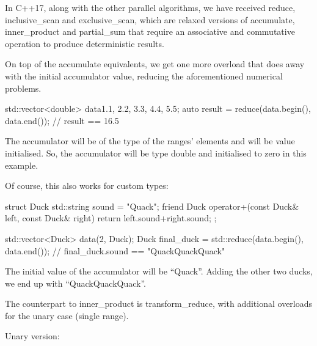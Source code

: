 In C++17, along with the other parallel algorithms, we have received reduce, inclusive\_scan and exclusive\_scan, which are relaxed versions of accumulate, inner\_product and partial\_sum that require an associative and commutative operation to produce deterministic results.



On top of the accumulate equivalents, we get one more overload that does away with the initial accumulator value, reducing the aforementioned numerical problems.

\begin{box-note}
\begin{cppcode}
std::vector<double> data{1.1, 2.2, 3.3, 4.4, 5.5};
auto result = reduce(data.begin(), data.end());
// result == 16.5
\end{cppcode}
\end{box-note}

The accumulator will be of the type of the ranges’ elements and will be value initialised. So, the accumulator will be type double and initialised to zero in this example.

Of course, this also works for custom types:

\begin{box-note}
\begin{cppcode}
struct Duck {
    std::string sound = "Quack";
    friend Duck operator+(const Duck& left, const Duck& right) {
        return {left.sound+right.sound};
    }
};

std::vector<Duck> data(2, Duck{});
Duck final_duck = std::reduce(data.begin(), data.end());
// final_duck.sound == "QuackQuackQuack"
\end{cppcode}
\end{box-note}

The initial value of the accumulator will be “Quack”. Adding the other two ducks, we end up with “QuackQuackQuack”.

The counterpart to inner\_product is transform\_reduce, with additional overloads for the unary case (single range).


Unary version:


